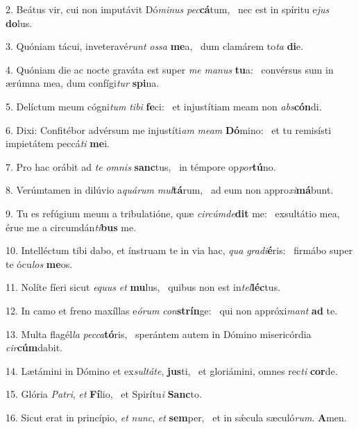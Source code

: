 2. Beátus vir, cui non imputávit Dó\textit{mi}\textit{nus} \textit{pec}\textbf{cá}tum, \ast\  nec est in spíritu e\textit{jus} \textbf{do}lus.\

3. Quóniam tácui, inveteravé\textit{runt} \textit{os}\textit{sa} \textbf{me}a, \ast\  dum clamárem to\textit{ta} \textbf{di}e.\

4. Quóniam die ac nocte graváta est super \textit{me} \textit{ma}\textit{nus} \textbf{tu}a: \ast\  convérsus sum in ærúmna mea, dum confígi\textit{tur} \textbf{spi}na.\

5. Delíctum meum cógni\textit{tum} \textit{ti}\textit{bi} \textbf{fe}ci: \ast\  et injustítiam meam non \textit{abs}\textbf{cón}di.\

6. Dixi: Confitébor advérsum me injustíti\textit{am} \textit{me}\textit{am} \textbf{Dó}mino: \ast\  et tu remisísti impietátem peccá\textit{ti} \textbf{me}i.\

7. Pro hac orábit ad \textit{te} \textit{om}\textit{nis} \textbf{sanc}tus, \ast\  in témpore op\textit{por}\textbf{tú}no.\

8. Verúmtamen in dilúvio a\textit{quá}\textit{rum} \textit{mul}\textbf{tá}rum, \ast\  ad eum non appro\textit{xi}\textbf{má}bunt.\

9. Tu es refúgium meum a tribulatióne, quæ \textit{cir}\textit{cúm}\textit{de}\textbf{dit} me: \ast\  exsultátio mea, érue me a circumdán\textit{ti}\textbf{bus} me.\

10. Intelléctum tibi dabo, et ínstruam te in via hac, \textit{qua} \textit{gra}\textit{di}\textbf{é}ris: \ast\  firmábo super te ócu\textit{los} \textbf{me}os.\

11. Nolíte fíeri sicut \textit{e}\textit{quus} \textit{et} \textbf{mu}lus, \ast\  quibus non est in\textit{tel}\textbf{léc}tus.\

12. In camo et freno maxíllas e\textit{ó}\textit{rum} \textit{con}\textbf{strín}ge: \ast\  qui non appróxi\textit{mant} \textbf{ad} te.\

13. Multa flagél\textit{la} \textit{pec}\textit{ca}\textbf{tó}ris, \ast\  sperántem autem in Dómino misericórdia \textit{cir}\textbf{cúm}dabit.\

14. Lætámini in Dómino et ex\textit{sul}\textit{tá}\textit{te}, \textbf{jus}ti, \ast\  et gloriámini, omnes rec\textit{ti} \textbf{cor}de.\

15. Glória \textit{Pa}\textit{tri}, \textit{et} \textbf{Fí}lio, \ast\  et Spirítu\textit{i} \textbf{Sanc}to.\

16. Sicut erat in princípio, \textit{et} \textit{nunc}, \textit{et} \textbf{sem}per, \ast\  et in sǽcula sæculó\textit{rum}. \textbf{A}men.\

